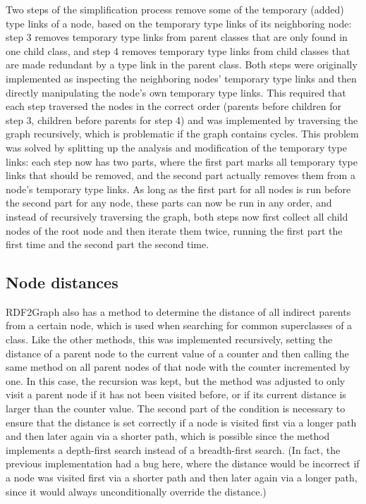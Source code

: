 Two steps of the simplification process
remove some of the temporary (added) type links of a node,
based on the temporary type links of its neighboring node:
step 3 removes temporary type links from parent classes that are only found in one child class,
and step 4 removes temporary type links from child classes that are made redundant by a type link in the parent class.
Both steps were originally implemented as inspecting the neighboring nodes’ temporary type links
and then directly manipulating the node’s own temporary type links.
This required that each step traversed the nodes in the correct order
(parents before children for step 3,
children before parents for step 4)
and was implemented by traversing the graph recursively,
which is problematic if the graph contains cycles.
This problem was solved by splitting up the analysis and modification of the temporary type links:
each step now has two parts,
where the first part marks all temporary type links that should be removed,
and the second part actually removes them from a node’s temporary type links.
As long as the first part for all nodes is run before the second part for any node,
these parts can now be run in any order,
and instead of recursively traversing the graph,
both steps now first collect all child nodes of the root node
and then iterate them twice,
running the first part the first time and the second part the second time.

\subsection{Node distances}
\label{subsec:RDF2Graph+Wikidata:cyclic-graph:distance}

\gls{RDF2Graph} also has a method to determine the distance of all indirect parents from a certain node,
which is used when searching for common superclasses of a class.
Like the other methods, this was implemented recursively,
setting the distance of a parent node to the current value of a counter
and then calling the same method on all parent nodes of that node with the counter incremented by one.
In this case, the recursion was kept,
but the method was adjusted to only visit a parent node
if it has not been visited before, or if its current distance is larger than the counter value.
The second part of the condition is necessary to ensure that the distance is set correctly
if a node is visited first via a longer path and then later again via a shorter path,
which is possible since the method implements a depth-first search instead of a breadth-first search.
(In fact, the previous implementation had a bug here,
where the distance would be incorrect if a node was visited first via a shorter path and then later again via a longer path,
since it would always unconditionally override the distance.)

